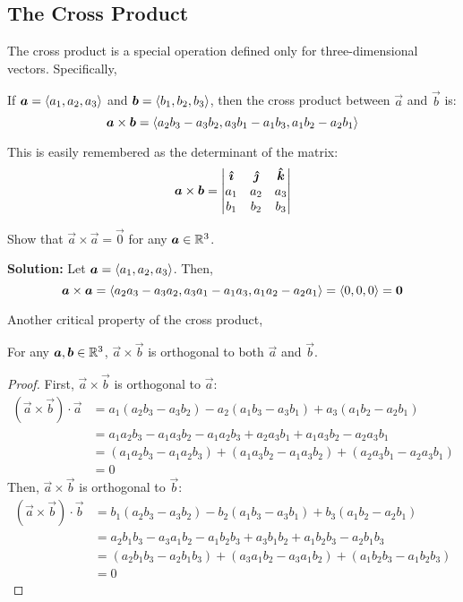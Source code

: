 \subsection{The Cross Product}
The cross product is a special operation defined only for three-dimensional vectors. Specifically,
\begin{definition}
    If \(\boldsymbol{a} = \left\langle a_1, a_2, a_3\right\rangle\) and \(\boldsymbol{b} = \left\langle b_1, b_2, b_3\right\rangle\), then the cross product between \(\vec a\) and \(\vec b\) is:
    \[\boldsymbol{a} \times \boldsymbol{b} = \left\langle a_2b_3 - a_3b_2, a_3b_1-a_1b_3, a_1b_2-a_2b_1\right\rangle\]
\end{definition}
This is easily remembered as the determinant of the matrix:
\[ \boldsymbol{a} \times \boldsymbol{b} = \begin{vmatrix}
    \boldsymbol{\hat{\imath}} & \boldsymbol{\hat{\jmath}} & \boldsymbol{\hat{k}} \\
    a_1 & a_2 & a_3 \\
    b_1 & b_2 & b_3
\end{vmatrix} \]
\begin{example}
    Show that \(\vec a \times \vec a = \vec 0\) for any \(\boldsymbol{a} \in \mathbb{R}^3\). \par 
    \textbf{Solution: } Let \(\boldsymbol{a} = \left\langle a_1, a_2, a_3\right\rangle\). Then, \[\boldsymbol{a} \times \boldsymbol{a} = \left\langle a_2a_3-a_3a_2, a_3a_1-a_1a_3, a_1a_2-a_2a_1\right\rangle = \left\langle0,0,0\right\rangle=\boldsymbol{0}\]
\end{example}
Another critical property of the cross product,
\begin{theorem}
    For any \(\boldsymbol{a}, \boldsymbol{b} \in \mathbb{R}^3\), \(\vec a \times \vec b\) is orthogonal to both \(\vec a\) and \(\vec b\).
\end{theorem}
\begin{proof}
    First, \(\vec a \times \vec b\) is orthogonal to \(\vec a\):
    \begin{align*}
        (\vec a \times \vec b) \cdot \vec a &= a_1(a_2b_3-a_3b_2) - a_2(a_1b_3-a_3b_1) + a_3(a_1b_2 - a_2b_1) \\
        &= a_1a_2b_3 - a_1a_3b_2 - a_1a_2b_3 + a_2a_3b_1 + a_1a_3b_2 - a_2a_3b_1 \\
        &= (a_1a_2b_3 - a_1a_2b_3) + (a_1a_3b_2 - a_1a_3b_2) + (a_2a_3b_1 - a_2a_3b_1) \\
        &= 0
    \end{align*}
    Then, \(\vec a \times \vec b\) is orthogonal to \(\vec b\):    \begin{align*}
        (\vec a \times \vec b) \cdot \vec b &= b_1(a_2b_3-a_3b_2) - b_2(a_1b_3-a_3b_1) + b_3(a_1b_2 - a_2b_1) \\
        &= a_2b_1b_3 - a_3a_1b_2 - a_1b_2b_3 + a_3b_1b_2 + a_1b_2b_3 - a_2b_1b_3 \\
        &= (a_2b_1b_3 - a_2b_1b_3) + (a_3a_1b_2 - a_3a_1b_2) + (a_1b_2b_3 - a_1b_2b_3) \\
        &= 0
    \end{align*}
\end{proof}
